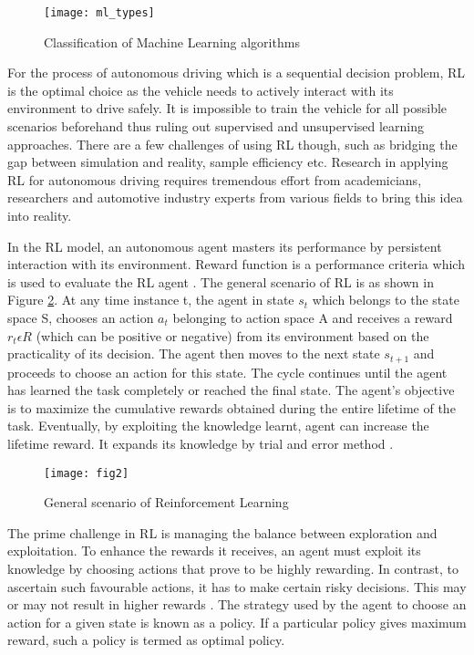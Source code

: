 \begin{figure}[h]
	\centering
	\texttt{[image: ml\_types]}
	\caption{Classification of Machine Learning algorithms \cite{peng2021machine} }
	\label{fig:fig0}
\end{figure}

\par
For the process of autonomous driving which is a sequential decision problem, RL is the optimal choice as the vehicle needs to actively interact with its environment to drive safely. It is impossible to train the vehicle for all possible scenarios beforehand thus ruling out supervised and unsupervised learning approaches. There are a few challenges of using RL though, such as bridging the gap between simulation and reality, sample efficiency etc. Research in applying RL for autonomous driving requires tremendous effort from academicians, researchers and automotive industry experts from various fields to bring this idea into reality.

In the RL model, an autonomous agent masters its performance by persistent interaction with its environment. Reward function is a performance criteria which is used to evaluate the RL agent \cite{naveen2020survey}. The general scenario of RL is as shown in Figure \ref{fig:genRL}. At any time instance t, the agent in state $s_t$ which belongs to the state space S, chooses an action $a_t$ belonging to action space A and receives a reward $r_t \epsilon R$ (which can be positive or negative) from its environment based on the practicality of its decision. The agent then moves to the next state $s_{t+1}$ and proceeds to choose an action for this state. The cycle continues until the agent has learned the task completely or reached the final state. The agent’s objective is to maximize the cumulative rewards obtained during the entire lifetime of the task. Eventually, by exploiting the knowledge learnt, agent can increase the lifetime reward. It expands its knowledge by trial and error method \cite{naveen2020survey}. 



\begin{figure}
	\centering
	\texttt{[image: fig2]}
	\caption{General scenario of Reinforcement Learning \cite{naveen2020survey} }
	\label{fig:genRL}
\end{figure}



The prime challenge in RL is managing the balance between exploration and exploitation. To enhance the rewards it receives, an agent must exploit its knowledge by choosing actions that prove to be highly rewarding. In contrast, to ascertain such favourable actions, it has to make certain risky decisions. This may or may not result in higher rewards \cite{rahmati2019uw}. The strategy used by the agent to choose an action for a given state is known as a policy. If a particular policy gives maximum reward, such a policy is termed as optimal policy. 

